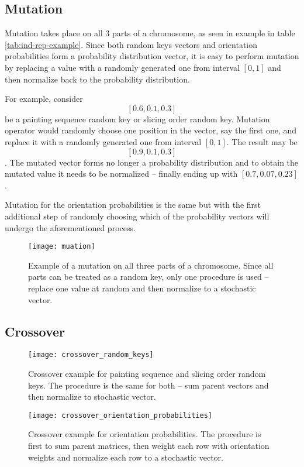 \subsection{Mutation}\label{subsec:mutation}
Mutation takes place on all 3 parts of a chromosome, as seen in example in table \ref{tab:ind-rep-example}.
Since both random keys vectors and orientation probabilities form a probability distribution vector,
it is easy to perform mutation by replacing a value with a randomly generated one from interval $[0,1]$
and then normalize back to the probability distribution.

For example, consider $$[0.6, 0.1, 0.3]$$ be a painting sequence random key or slicing order random key.
Mutation operator would randomly choose one position in the vector, say the first one, and replace it
with a randomly generated one from interval $[0,1]$. The result may be $$[0.9, 0.1, 0.3]$$.
The mutated vector forms no longer a probability distribution and to obtain the mutated value
it needs to be normalized – finally ending up with $[0.7, 0.07, 0.23]$.

Mutation for the orientation probabilities is the same but with the first additional
step of randomly choosing which of the probability vectors will undergo the aforementioned process.

\begin{figure}[htp]
    \texttt{[image: muation]}\caption{
        Example of a mutation on all three parts of a chromosome.
        Since all parts can be treated as a random key, only one procedure
        is used – replace one value at random and then normalize to a stochastic vector.
    }
    \label{fig:mutation}
\end{figure}

\subsection{Crossover}\label{subsec:crossover}

\begin{figure}[htp]
    \texttt{[image: crossover\_random\_keys]}\caption{
        Crossover example for painting sequence and slicing order random keys.
        The procedure is the same for both – sum parent vectors and then normalize to stochastic vector.
    }
    \label{fig:crossover-random-keys}
\end{figure}

\begin{figure}[htp]
    \texttt{[image: crossover\_orientation\_probabilities]}\caption{
        Crossover example for orientation probabilities. The procedure is first to sum parent matrices,
        then weight each row with orientation weights and normalize each row to a stochastic vector.}
    \label{fig:crossover-orientation-probabilities}
\end{figure}


